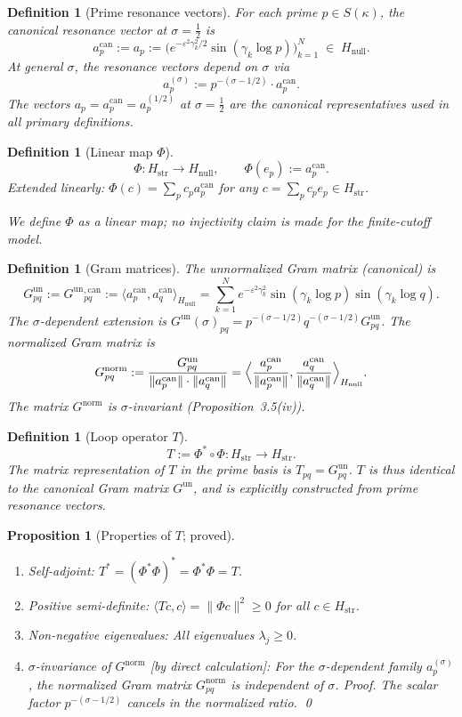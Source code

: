 \documentclass[11pt]{article}
\newtheorem{proposition}[theorem]{Proposition}
\newtheorem{definition}[theorem]{Definition}
\newcommand{\Hstr}{H_{\mathrm{str}}}
\newcommand{\Hnull}{H_{\mathrm{null}}}
\newcommand{\Gun}{G^{\mathrm{un}}}
\newcommand{\Gnorm}{G^{\mathrm{norm}}}
\newcommand{\acan}{a_p^{\mathrm{can}}}
\begin{document}
\begin{definition}[Prime resonance vectors]
For each prime $p\in S(\kappa)$, the \emph{canonical resonance vector}
at $\sigma=\tfrac12$ is
\[
\acan := a_p :=
\bigl(e^{-\varepsilon^2\gamma_k^2/2}\sin(\gamma_k\log p)\bigr)_{k=1}^N
\;\in\;\Hnull.
\]
At general $\sigma$, the resonance vectors depend on $\sigma$ via
\[
a_p^{(\sigma)} := p^{-(\sigma-1/2)}\cdot\acan.
\]
The vectors $a_p=\acan=a_p^{(1/2)}$ at $\sigma=\tfrac12$ are the
canonical representatives used in all primary definitions.
\end{definition}

\begin{definition}[Linear map $\Phi$]
\[
\Phi\colon\Hstr\to\Hnull,\qquad\Phi(e_p):=\acan.
\]
Extended linearly: $\Phi(c)=\sum_p c_p\acan$ for any
$c=\sum_p c_p e_p\in\Hstr$.

\emph{We define $\Phi$ as a linear map; no injectivity claim is made for the
finite-cutoff model.}
\end{definition}

\begin{definition}[Gram matrices]
The \emph{unnormalized Gram matrix} (canonical) is
\[
\Gun_{pq} := \Gun{}^{\mathrm{,can}}_{pq}
:= \langle\acan,a_q^{\mathrm{can}}\rangle_{\Hnull}
= \sum_{k=1}^N e^{-\varepsilon^2\gamma_k^2}\sin(\gamma_k\log p)\sin(\gamma_k\log q).
\]
The $\sigma$-dependent extension is
$\Gun(\sigma)_{pq}=p^{-(\sigma-1/2)}q^{-(\sigma-1/2)}\Gun_{pq}$.
The \emph{normalized Gram matrix} is
\[
\Gnorm_{pq}:=\frac{\Gun_{pq}}{\|\acan\|\cdot\|a_q^{\mathrm{can}}\|}
=\Bigl\langle\frac{\acan}{\|\acan\|},\frac{a_q^{\mathrm{can}}}{\|a_q^{\mathrm{can}}\|}\Bigr\rangle_{\Hnull}.
\]
The matrix $\Gnorm$ is $\sigma$-invariant (Proposition~3.5(iv)).
\end{definition}

\begin{definition}[Loop operator $T$]
\[
T:=\Phi^*\circ\Phi\colon\Hstr\longrightarrow\Hstr.
\]
The matrix representation of $T$ in the prime basis is $T_{pq}=\Gun_{pq}$.
$T$ is thus identical to the canonical Gram matrix $\Gun$, and is explicitly
constructed from prime resonance vectors.
\end{definition}

\begin{proposition}[Properties of $T$; proved]
\label{prop:T}
\begin{enumerate}[label=\emph{(\roman*)}, leftmargin=2.2em]
\item \emph{Self-adjoint:} $T^*=(\Phi^*\Phi)^*=\Phi^*\Phi=T$.
\item \emph{Positive semi-definite:} $\langle Tc,c\rangle=\|\Phi c\|^2\geq 0$
for all $c\in\Hstr$.
\item \emph{Non-negative eigenvalues:} All eigenvalues $\lambda_j\geq 0$.
\item \emph{$\sigma$-invariance of $\Gnorm$} [by direct calculation]:
For the $\sigma$-dependent family $a_p^{(\sigma)}$, the normalized Gram matrix
$\Gnorm_{pq}$ is independent of $\sigma$. \emph{Proof.} The scalar factor
$p^{-(\sigma-1/2)}$ cancels in the normalized ratio. \qed
\end{enumerate}
\end{proposition}
\end{document}
